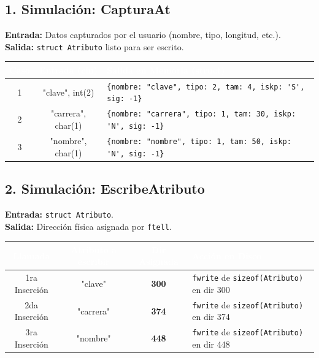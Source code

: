\documentclass[12pt]{article}
\begin{document}
\subsection*{1. Simulación: CapturaAt}
\textbf{Entrada:} Datos capturados por el usuario (nombre, tipo, longitud, etc.).\\
\textbf{Salida:} \verb|struct Atributo| listo para ser escrito.

\begin{table}[H]
\centering
\renewcommand{\arraystretch}{1.05}
\begin{tabular}{|c|c|l|}
\hline
\rowcolor{MainBlue}
\textcolor{white}{\textbf{Caso}} & \textcolor{white}{\textbf{Entrada (cin)}} & \textcolor{white}{\textbf{Salida en Memoria (struct)}} \\
\hline
1 & "clave", int(2) & \verb|{nombre: "clave", tipo: 2, tam: 4, iskp: 'S', sig: -1}| \\
\hline
2 & "carrera", char(1) & \verb|{nombre: "carrera", tipo: 1, tam: 30, iskp: 'N', sig: -1}| \\
\hline
3 & "nombre", char(1) & \verb|{nombre: "nombre", tipo: 1, tam: 50, iskp: 'N', sig: -1}| \\
\hline
\end{tabular}
\end{table}

{}
\subsection*{2. Simulación: EscribeAtributo}
\textbf{Entrada:} \verb|struct Atributo|.\\
\textbf{Salida:} Dirección física asignada por \verb|ftell|.

\begin{table}[H]
\centering
\renewcommand{\arraystretch}{1.05}
\begin{tabular}{|c|c|c|p{6cm}|}
\hline
\rowcolor{MainBlue}
\textcolor{white}{\textbf{Llamada}} & \textcolor{white}{\textbf{Atributo a escribir}} & \textcolor{white}{\textbf{Dir Asignada}} & \textcolor{white}{\textbf{Acción en Disco}} \\
\hline
1ra Inserción & "clave" & \textbf{300} & \verb|fwrite| de \verb|sizeof(Atributo)| en dir 300 \\
\hline
2da Inserción & "carrera" & \textbf{374} & \verb|fwrite| de \verb|sizeof(Atributo)| en dir 374 \\
\hline
3ra Inserción & "nombre" & \textbf{448} & \verb|fwrite| de \verb|sizeof(Atributo)| en dir 448 \\
\hline
\end{tabular}
\end{table}
\end{document}
